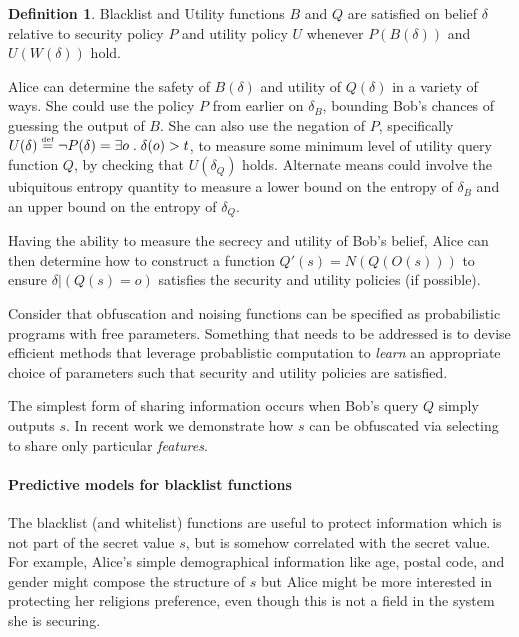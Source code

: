 \documentclass{article} %
\newcommand{\asecret}[0]{s}
\newcommand{\rsecret}[0]{s}
\newcommand{\paren}[1]{\left( #1 \right)}
\newcommand{\cond}[0]{|}
\newcommand{\qsep}[0]{\; . \;}
\newcommand{\stacklabel}[1]{\stackrel{\smash{\scriptscriptstyle \mathrm{#1}}}}
\newcommand{\defeq}{\stacklabel{def}=}
\theoremstyle{plain} %
\theoremstyle{definition} %
\newtheorem*{definition-un}{Definition}
\begin{document}
\begin{definition-un} Blacklist and Utility functions $ B $ and $ Q $
  are satisfied on belief $ \delta $ relative to security policy $ P $
  and utility policy $ U $ whenever $P(B(\delta))$ and $U(W(\delta))$ hold.
\end{definition-un}

Alice can determine the safety of $ B(\delta) $ and utility of $
Q(\delta) $ in a variety of ways. She could use the policy $ P $ from
earlier on $ \delta_B $, bounding Bob's chances of guessing the output
of $ B $. She can also use the negation of $ P $, specifically $
U(\delta) \defeq \neg P(\delta) = \exists o \qsep \delta(o) > t $, to
measure some minimum level of utility query function $ Q $,
by checking that $ U(\delta_Q) $ holds. Alternate means could involve
the ubiquitous entropy quantity to measure a lower bound on the
entropy of $ \delta_B $ and an upper bound on the entropy of $
\delta_Q $.


Having the ability to measure the secrecy and utility of Bob's belief,
Alice can then determine how to construct a function $ Q'(\asecret) =
N(Q(O(\asecret))) $ to ensure $ \delta \cond \paren{Q(\rsecret) = o} $
satisfies the security and utility policies (if possible).


Consider that obfuscation and noising functions can be specified as
probabilistic programs with free parameters. Something that needs to
be addressed is to devise efficient methods that leverage
probablistic computation to \emph{learn} an appropriate choice
of parameters such that security and utility policies are satisfied.

The simplest form of sharing information occurs when Bob's
query $ Q $ simply outputs $ \rsecret $. In recent work we demonstrate
how $ \asecret $ can be obfuscated via selecting to share only particular
\emph{features}.
 
\paragraph*{Predictive models for blacklist functions} The blacklist
(and whitelist) functions are useful to protect information which is
not part of the secret value $ \rsecret $, but is somehow correlated
with the secret value. For example, Alice's simple demographical
information like age, postal code, and gender might compose the
structure of $ \rsecret $ but Alice might be more interested in
protecting her religions preference, even though this is not a field
in the system she is securing.
\end{document}
